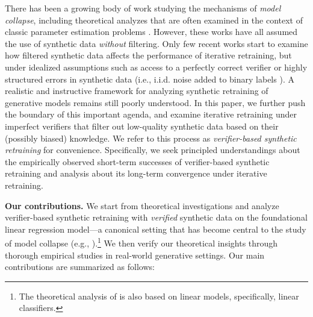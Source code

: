 There has been a growing body of work studying the mechanisms of \emph{model collapse}, including theoretical analyzes that are often examined in the context of classic parameter estimation problems  \citep{dohmatob2024model,dohmatobstrong,gerstgrasser2024model,dey2024universality,xu2025probabilistic,sureshrate}. However, these works have all assumed the use of  synthetic data \emph{without} filtering. Only few recent works start to examine how filtered synthetic data  affects the performance of iterative retraining, but  under idealized assumptions such as access to a perfectly correct verifier  \citep{amin2025escaping}  or highly structured errors in synthetic data (i.e., i.i.d. noise added to binary labels  \citep{feng2024beyond}). A realistic and instructive framework for analyzing synthetic retraining of generative models remains still poorly understood. In this paper, we further push the boundary of this important agenda, and  examine iterative retraining under imperfect verifiers that filter out low-quality synthetic data based on their (possibly biased) knowledge. We refer to this process as    \emph{verifier-based synthetic retraining} for convenience. Specifically, we seek principled understandings about the empirically observed short-term successes of verifier-based synthetic retraining and analysis about its long-term convergence under iterative retraining.  



\medskip
\noindent
\textbf{Our contributions.}     We start from  theoretical investigations and  analyze verifier-based synthetic retraining with \emph{verified} synthetic data on the foundational linear regression model---a canonical  setting that has become central to the study of model collapse (e.g., \citep{dohmatob2024model,dohmatobstrong,gerstgrasser2024model,zhusynthesize,garg2025preventing}).\footnote{The theoretical analysis of \citep{feng2024beyond} is also based on linear models, specifically, linear classifiers.} We then verify our theoretical insights through thorough empirical studies in real-world generative settings.  Our main contributions are summarized as follows:

